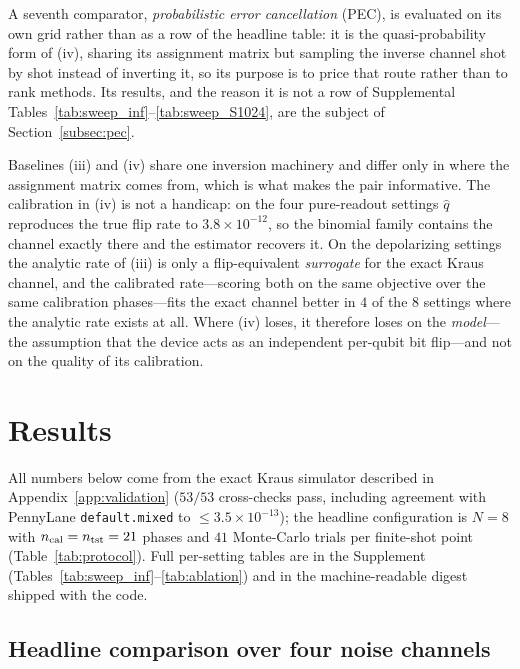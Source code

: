 \documentclass[ASNA,twocolumn]{USG}
\begin{document}
A seventh comparator, \emph{probabilistic error cancellation} (PEC), is evaluated
on its own grid rather than as a row of the headline table: it is the
quasi-probability form of (iv), sharing its assignment matrix but sampling the
inverse channel shot by shot instead of inverting it, so its purpose is to price
that route rather than to rank methods.  Its results, and the reason it is not a
row of Supplemental Tables~\ref{tab:sweep_inf}--\ref{tab:sweep_S1024}, are the
subject of Section~\ref{subsec:pec}.

Baselines (iii) and (iv) share one inversion machinery and differ only in where
the assignment matrix comes from, which is what makes the pair informative.  The
calibration in (iv) is not a handicap: on the four pure-readout settings
$\hat q$ reproduces the true flip rate to $3.8\times10^{-12}$, so the binomial
family contains the channel exactly there and the estimator recovers it.  On the
depolarizing settings the analytic rate of (iii) is only a flip-equivalent
\emph{surrogate} for the exact Kraus channel, and the calibrated rate---scoring
both on the same objective over the same calibration phases---fits the exact
channel better in $4$ of the $8$ settings where the analytic
rate exists at all.  Where (iv) loses, it therefore loses on the
\emph{model}---the assumption that the device acts as an independent per-qubit
bit flip---and not on the quality of its calibration.

\section{Results}
\label{sec:results}

All numbers below come from the exact Kraus simulator described in
Appendix~\ref{app:validation} ($53/53$ cross-checks pass, including agreement
with PennyLane \texttt{default.mixed} to $\le3.5\times10^{-13}$); the headline
configuration is $N=8$ with $n_{\rm cal}=n_{\rm tst}=21$ phases and $41$
Monte-Carlo trials per finite-shot point (Table~\ref{tab:protocol}).  Full
per-setting tables are in the Supplement
(Tables~\ref{tab:sweep_inf}--\ref{tab:ablation}) and in the
machine-readable digest shipped with the code.



\subsection{Headline comparison over four noise channels}
\label{subsec:sweep}
\end{document}
